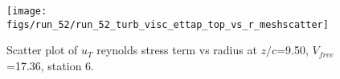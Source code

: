 \begin{figure}[H]
\centering
\texttt{[image: figs/run\_52/run\_52\_turb\_visc\_ettap\_top\_vs\_r\_meshscatter]}
\caption{Scatter plot of $
u_T$ reynolds stress term vs radius at $z/c$=9.50, $V_{free}$=17.36, station 6.}
\end{figure}


